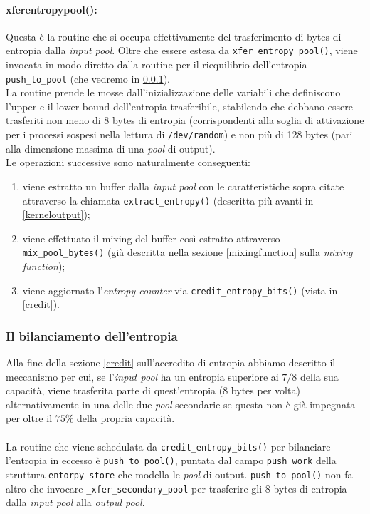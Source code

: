 \documentclass{article}
\begin{document}
 \paragraph{\textunderscore{}xfer\textunderscore{}entropy\textunderscore{}pool():}
 Questa è la routine che si occupa effettivamente del trasferimento di bytes di
 entropia dalla \emph{input pool}. Oltre che essere estesa da
 \verb+xfer_entropy_pool()+, viene invocata in modo diretto dalla routine per il
 riequilibrio dell'entropia \verb+push_to_pool+ (che
 vedremo in \ref{bilanciamento}).\\
 La routine prende le mosse dall'inizializzazione delle variabili che
 definiscono l'upper e il lower bound dell'entropia trasferibile, stabilendo che
 debbano essere trasferiti non meno di 8 bytes di entropia (corrispondenti alla
 soglia di attivazione per i processi sospesi nella lettura di
 \verb+/dev/random+) e non più di 128 bytes (pari alla dimensione massima di
 una \emph{pool} di output).\\
 Le operazioni successive sono naturalmente conseguenti: 
 \begin{enumerate}
   \item viene estratto un buffer dalla \emph{input pool} con le caratteristiche
   sopra citate attraverso la chiamata \verb+extract_entropy()+ (descritta più
   avanti in \ref{kerneloutput});
   \item viene effettuato il mixing del buffer così estratto attraverso
   \verb+mix_pool_bytes()+ (già descritta nella sezione
   \ref{mixingfunction} sulla \emph{mixing function});
   \item viene aggiornato l'\emph{entropy counter} via
   \verb+credit_entropy_bits()+ (vista in \ref{credit}).
 \end{enumerate}
 
 \subsubsection{Il bilanciamento dell'entropia} \label{bilanciamento}
 Alla fine della sezione \ref{credit} sull'accredito di entropia abbiamo
 descritto il meccanismo per cui, se l'\emph{input pool} ha un entropia
 superiore ai $7/8$ della sua capacità, viene trasferita parte di quest'entropia
 (8 bytes per volta) alternativamente in una delle due \emph{pool} secondarie se
 questa non è già impegnata per oltre il $75\%$ della propria capacità.
 \paragraph{}La routine che viene schedulata da \verb+credit_entropy_bits()+ per
 bilanciare l'entropia in eccesso è \verb+push_to_pool()+, puntata
 dal campo \verb+push_work+ della struttura \verb+entorpy_store+ che modella le
 \emph{pool} di output. \verb+push_to_pool()+ non fa altro che invocare
 \verb+_xfer_secondary_pool+ per trasferire gli 8 bytes di entropia dalla
 \emph{input pool} alla \emph{outpul pool}.
 
\end{document}
